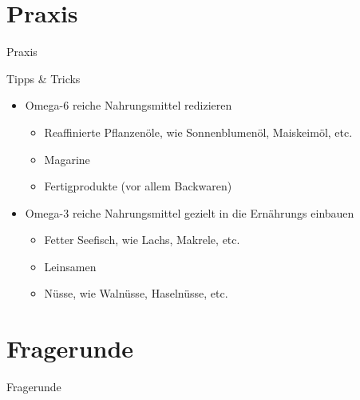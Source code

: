 \documentclass[xcolor=dvipsnames]{beamer}
\begin{document}
    \section{Praxis}
    {
        \begin{frame}
            \begin{center}
                \Huge Praxis
            \end{center}
        \end{frame}
    }

    \begin{frame}{Tipps \& Tricks}
        \begin{itemize}
            \setlength\itemsep{1em}
            \item Omega-6 reiche Nahrungsmittel redizieren
            \begin{itemize}
                \item Reaffinierte Pflanzenöle, wie Sonnenblumenöl, Maiskeimöl, etc.
                \item Magarine
                \item Fertigprodukte (vor allem Backwaren)
            \end{itemize}
            \item Omega-3 reiche Nahrungsmittel gezielt in die Ernährungs einbauen
            \begin{itemize}
                \item Fetter Seefisch, wie Lachs, Makrele, etc.
                \item Leinsamen
                \item Nüsse, wie Walnüsse, Haselnüsse, etc.
            \end{itemize}
        \end{itemize}
    \end{frame}

    \section{Fragerunde}
    {
        \begin{frame}
            \begin{center}
                \Huge Fragerunde
            \end{center}
        \end{frame}
    }
\end{document}
